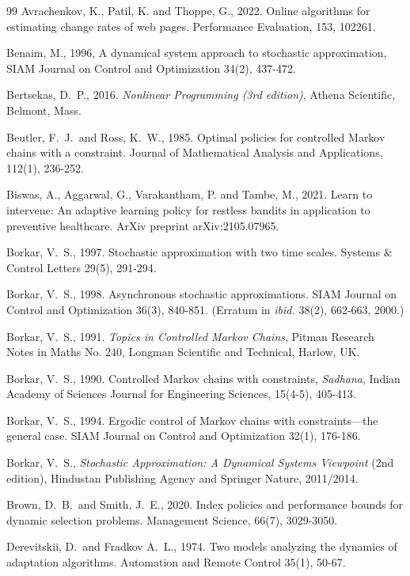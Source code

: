 \documentclass[12pt]{article}
\numberwithin{equation}{section}
\newcommand{\1}{\textbf{1}}
\begin{document}
\begin{thebibliography}{99}
 Avrachenkov, K., Patil, K. and Thoppe, G., 2022. 
Online algorithms for estimating change rates of web pages. Performance Evaluation, 153, 102261.

 Benaim, M., 1996, A dynamical system approach to stochastic approximation, SIAM Journal on Control and Optimization 34(2), 437-472.

 Bertsekas, D.\ P., 2016. \textit{Nonlinear Programming (3rd edition)}, Athena Scientific, Belmont, Mass.

 Beutler, F.\ J.\ and Ross, K.\ W., 1985. Optimal policies for controlled Markov chains with a constraint. Journal of Mathematical Analysis and Applications, 112(1), 236-252.
    
 Biswas, A., Aggarwal, G., Varakantham, P. and Tambe, M., 2021. 
Learn to intervene: An adaptive learning policy for restless bandits in application to preventive healthcare. 
ArXiv preprint arXiv:2105.07965.

 Borkar, V.\ S., 1997.  Stochastic approximation with two time scales. Systems $\&$ Control Letters 29(5), 291-294.

 Borkar, V.\ S., 1998. Asynchronous stochastic approximations. SIAM Journal on Control and Optimization 36(3), 840-851. (Erratum in \textit{ibid.} 38(2), 662-663, 2000.)

 Borkar, V.\ S., 1991. \textit{Topics in Controlled Markov Chains}, Pitman Research Notes in Maths No. 240,
Longman Scientific and Technical, Harlow, UK.

 Borkar, V.\ S.,  1990. Controlled Markov chains with constraints, 
\textit{Sadhana}, Indian Academy of Sciences Journal for Engineering Sciences, 15(4-5), 405-413.

 Borkar, V.\ S., 1994. Ergodic control of Markov chains with constraints—the general case. SIAM Journal on Control and Optimization 32(1), 176-186.

 Borkar, V.\ S., \textit{Stochastic Approximation: A Dynamical Systems Viewpoint} (2nd edition), Hindustan Publishing Agency and Springer Nature, 2011/2014.

 Brown, D.\ B.\ and Smith, J.\ E., 2020. Index policies and performance bounds for dynamic selection problems. Management Science, 66(7), 3029-3050.

 Derevitskii, D.\ and Fradkov A.\ L., 1974. Two models analyzing the dynamics of adaptation algorithms.  Automation and Remote Control 35(1), 50-67.


\end{thebibliography}
\end{document}
